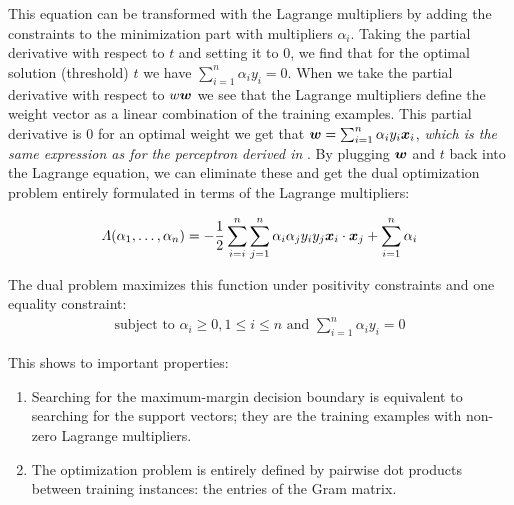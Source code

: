 This equation can be transformed with the Lagrange multipliers by adding the constraints to the minimization part with multipliers $\alpha_i$.
Taking the partial derivative with respect to $t$ and setting it to $0$, we find that for the optimal solution (threshold) $t$ we have $\sum_{i=1}^{n} \alpha_i y_i = 0$.
When we take the partial derivative with respect to $w\vectorsym{w}$ we see that the Lagrange multipliers define the weight vector as a linear combination of the training examples.
This partial derivative is $0$ for an optimal weight we get that $\vectorsym{w} = \sum_{i=1}^{n} \alpha_i y_i \vectorsym{x}_i$, \emph{which is the same expression as for the perceptron derived in }.
By plugging $\vectorsym{w}$ and $t$ back into the Lagrange equation, we can eliminate these and get the dual optimization problem entirely formulated in terms of the Lagrange multipliers:

\begin{equation}
  \Lambda(\alpha_1, \dots, \alpha_n) = - \frac{1}{2} \sum\limits_{i=i}^n \sum\limits_{j=1}^n \alpha_i \alpha_j y_i y_j \vectorsym{x}_i \cdot \vectorsym{x}_j + \sum\limits_{i=1}^n \alpha_i
\end{equation}

The dual problem maximizes this function under positivity constraints and one equality constraint:
\begin{equation}
\begin{aligned}
  \text{subject to } \alpha_i \geq 0, 1 \leq i \leq n \text{ and } \sum\limits_{i=1}^n \alpha_i y_i = 0
\end{aligned}
\end{equation}

This shows to important properties:
\begin{enumerate}
  \item Searching for the maximum-margin decision boundary is equivalent to searching for the support vectors; they are the training examples with non-zero Lagrange multipliers.
  \item The optimization problem is entirely defined by pairwise dot products between training instances: the entries of the Gram matrix.
\end{enumerate}

